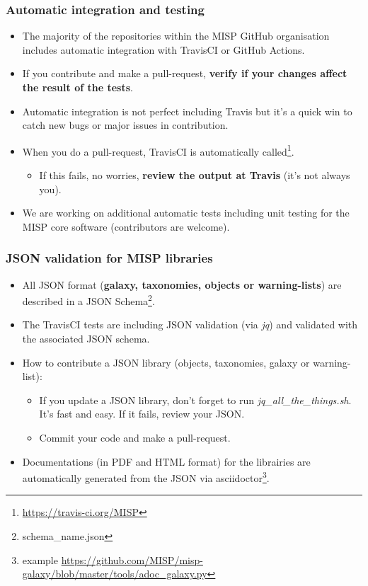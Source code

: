 \begin{frame}[fragile]
\frametitle{Automatic integration and testing}
\begin{itemize}
\item The majority of the repositories within the MISP GitHub organisation includes automatic integration with TravisCI or GitHub Actions.
\item If you contribute and make a pull-request, {\bf verify if your changes affect the result of the tests}.
\item Automatic integration is not perfect including Travis but it's a quick win to catch new bugs or major issues in contribution.
\item When you do a pull-request, TravisCI is automatically called\footnote{\url{https://travis-ci.org/MISP}}.
\begin{itemize}
\item If this fails, no worries, {\bf review the output at Travis} (it's not always you).
\end{itemize}
\item We are working on additional automatic tests including unit testing for the MISP core software (contributors are welcome).
\end{itemize}
\end{frame}

\begin{frame}[fragile]
\frametitle{JSON validation for MISP libraries}
\begin{itemize}
\item All JSON format ({\bf galaxy, taxonomies, objects or warning-lists}) are described in a JSON Schema\footnote{schema\_name.json}.
\item The TravisCI tests are including JSON validation (via \emph{jq}) and validated with the associated JSON schema.
\item How to contribute a JSON library (objects, taxonomies, galaxy or warning-list):
\begin{itemize}
\item If you update a JSON library, don't forget to run \emph{jq\_all\_the\_things.sh}. It's fast and easy. If it fails, review your JSON.
\item Commit your code and make a pull-request.
\end{itemize}
\item Documentations (in PDF and HTML format) for the librairies are automatically generated from the JSON via asciidoctor\footnote{example \url{https://github.com/MISP/misp-galaxy/blob/master/tools/adoc_galaxy.py}}.
\end{itemize}
\end{frame}

